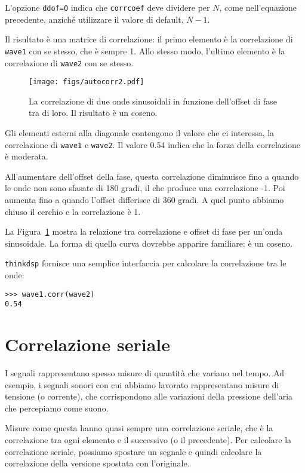 \documentclass[12pt]{book} \usepackage[width=5.5in,height=8.5in, hmarginratio=3:2,vmarginratio=1:1]{geometry}
\begin{document}
L'opzione {\tt ddof=0} indica che {\tt corrcoef} deve dividere per $N$, come nell'equazione precedente, anziché utilizzare il valore di default, $N-1$.

Il risultato è una matrice di correlazione: il primo elemento è la correlazione di {\tt wave1} con se stesso, che è sempre 1. Allo stesso modo, l'ultimo elemento è la correlazione di {\tt wave2} con se stesso.

\begin{figure} 

\centerline{\texttt{[image: figs/autocorr2.pdf]}} \caption{La correlazione di due onde sinusoidali in funzione dell'offset di fase tra di loro. Il risultato è un coseno.} \label{fig.autocorr2} \end{figure} 

Gli elementi esterni alla diagonale contengono il valore che ci interessa, la correlazione di {\tt wave1} e {\tt wave2}. Il valore 0.54 indica che la forza della correlazione è moderata.

All'aumentare dell'offset della fase, questa correlazione diminuisce fino a quando le onde non sono sfasate di 180 gradi, il che produce una correlazione -1. Poi aumenta fino a quando l'offset differisce di 360 gradi. A quel punto abbiamo chiuso il cerchio e la correlazione è 1.

La Figura~\ref{fig.autocorr2} mostra la relazione tra correlazione e offset di fase per un'onda sinusoidale. La forma di quella curva dovrebbe apparire familiare; è un coseno.

{\tt thinkdsp} fornisce una semplice interfaccia per calcolare la correlazione tra le onde:

\begin{verbatim} 
>>> wave1.corr(wave2)
0.54
 \end{verbatim} 

\section{Correlazione seriale} 

I segnali rappresentano spesso misure di quantità che variano nel tempo. Ad esempio, i segnali sonori con cui abbiamo lavorato rappresentano misure di tensione (o corrente), che corrispondono alle variazioni della pressione dell'aria che percepiamo come suono.

Misure come questa hanno quasi sempre una correlazione seriale, che è la correlazione tra ogni elemento e il successivo (o il precedente). Per calcolare la correlazione seriale, possiamo spostare un segnale e quindi calcolare la correlazione della versione spostata con l'originale.
\end{document}
